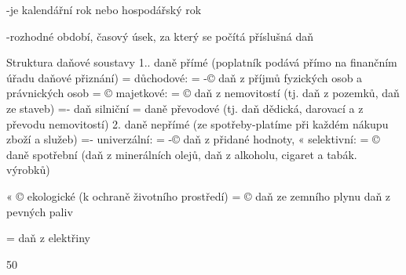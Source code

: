 -je kalendářní rok nebo hospodářský rok

-rozhodné období, časový úsek, za který se počítá příslušná daň

Struktura daňové soustavy
1.. daně přímé (poplatník podává přímo na finančním úřadu daňové přiznání)
= důchodové:
= -© daň z příjmů fyzických osob a právnických osob
= © majetkové:
= © daň z nemovitostí (tj. daň z pozemků, daň ze staveb)
=- daň silniční
= daně převodové (tj. daň dědická, darovací a z převodu nemovitostí)
2. daně nepřímé (ze spotřeby-platíme při každém nákupu zboží a služeb)
=- univerzální:
= -© daň z přidané hodnoty,
« selektivní:
= © daně spotřební (daň z minerálních olejů, daň z alkoholu, cigaret a tabák.
výrobků)

« © ekologické (k ochraně životního prostředí)
= © daň ze zemního plynu
daň z pevných paliv

= daň z elektřiny

50
\newpage